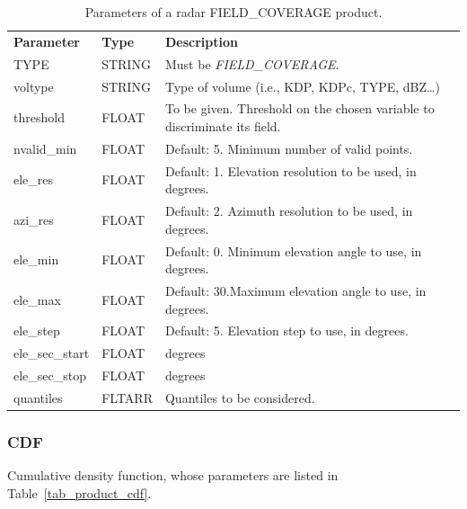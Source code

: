 \documentclass[a4paper,11pt,pdftex,twoside]{scrartcl}
\renewcommand{\bf}{\normalfont \bfseries}
\begin{document}
{{{   
\begin{table}[H]
 \begin{tabularx}{\textwidth}{llX}
 \bf{Parameter}  & \bf{Type}  & \bf{Description}\\
 TYPE           & STRING      & Must be \emph{FIELD\_COVERAGE}.\\
 voltype        & STRING      & Type of volume (i.e., KDP, KDPc, TYPE, dBZ\dots)\\
 threshold      & FLOAT       & To be given. Threshold on the chosen variable to discriminate its field.\\
 nvalid\_min & FLOAT &  Default: 5. Minimum number of valid points.\\
 ele\_res & FLOAT &  Default: 1. Elevation resolution to be used, in degrees.\\
 azi\_res & FLOAT &  Default: 2. Azimuth resolution to be used, in degrees.\\
 ele\_min & FLOAT &  Default: 0. Minimum elevation angle to use, in degrees.\\
 ele\_max & FLOAT &  Default: 30.Maximum elevation angle to use, in degrees.\\
 ele\_step & FLOAT &  Default: 5. Elevation step to use, in degrees.\\
 ele\_sec\_start & FLOAT & degrees \\
 ele\_sec\_stop & FLOAT &  degrees \\
 quantiles & FLTARR & Quantiles to be considered. \\
 \end{tabularx}
 \caption{Parameters of a radar FIELD\_COVERAGE product.}
 \label{tab_product_field_coverage}
 \end{table}   
        
\subsubsection{CDF}
   \label{subsec_cdf}
Cumulative density function, whose parameters are listed in  Table~\ref{tab_product_cdf}.   
   
}}}
\end{document}
